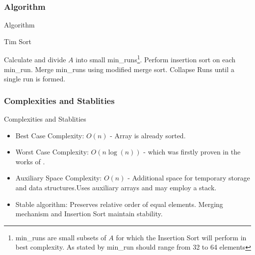 \documentclass[aspectratio=169]{beamer}
\begin{document}
  \subsubsection{Algorithm}
\begin{frame}{Algorithm}
  \begin{algorithm}[H]
    \caption{Tim Sort}
    \begin{algorithmic}[1]
        \State Calculate and divide $A$ into small min\_runs\footnote{min\_runs are small subsets of $A$ for which the Insertion Sort will perform in best complexity. As stated by \citet{peters2015TimSort} min\_run should range from 32 to 64 elements}.
        \State Perform insertion sort on each min\_run.
        \State Merge min\_runs using modified merge sort. Collapse Runs until a single run is formed.
      \EndProcedure
    \end{algorithmic}
  \end{algorithm}
\end{frame}


  
\subsubsection{Complexities and Stablities}
\begin{frame}{Complexities and Stablities}
 \begin{itemize}
    \item Best Case Complexity: $O(n)$ - Array is already sorted.
    \item Worst Case Complexity: $O(n\log(n))$ - which was firstly proven in the works of \cite{Auger-2015,Auger-2019}.

    \item Auxiliary Space Complexity: $O(n)$ - Additional space for temporary storage and data structures.Uses auxiliary arrays and may employ a stack.
  \item Stable algorithm: Preserves relative order of equal elements. Merging mechanism and Insertion Sort maintain stability.
  \end{itemize}
\end{frame}
\end{document}
